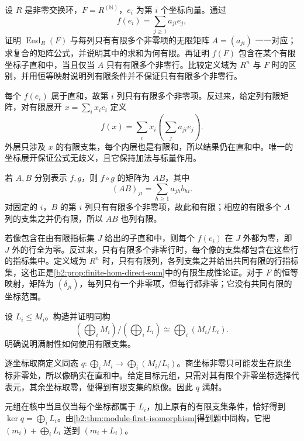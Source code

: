 \begin{exercise}\label{b2:ex:02-finite-hom-direct-sum}
	设 \(R\) 是非零交换环，\(F=R^{(\mathbb N)}\)，\(e_i\) 为第 \(i\) 个坐标向量。通过
	\[
		f(e_i)=\sum_{j\ge1}a_{ji}e_j,
	\]
	证明 \(\operatorname{End}_R(F)\) 与每列只有有限多个非零项的无限矩阵 \(A=(a_{ji})\) 一一对应；求复合的矩阵公式，并说明其中的求和为何有限。再证明 \(f(F)\) 包含在某个有限坐标子直和中，当且仅当 \(A\) 只有有限多个非零行。比较定义域为 \(R^n\) 与 \(F\) 时的区别，并用恒等映射说明列有限条件并不保证只有有限多个非零行。
\end{exercise}
\begin{solution}
	每个 \(f(e_i)\) 属于直和，故第 \(i\) 列只有有限多个非零项。反过来，给定列有限矩阵，对有限展开 \(x=\sum_i x_ie_i\) 定义
	\[
		f(x)=\sum_i x_i\left(\sum_j a_{ji}e_j\right).
	\]
	外层只涉及 \(x\) 的有限支集，每个内层也是有限和，所以结果仍在直和中。唯一的坐标展开保证公式无歧义，且它保持加法与标量作用。

	若 \(A,B\) 分别表示 \(f,g\)，则 \(f\circ g\) 的矩阵为 \(AB\)，其中
	\[
		(AB)_{ji}=\sum_{h\ge1}a_{jh}b_{hi}.
	\]
	对固定的 \(i\)，\(B\) 的第 \(i\) 列只有有限多个非零项，故此和有限；相应的有限多个 \(A\) 列的支集之并仍有限，所以 \(AB\) 也列有限。

	若像包含在由有限指标集 \(J\) 给出的子直和中，则每个 \(f(e_i)\) 在 \(J\) 外都为零，即 \(J\) 外的行全为零。反过来，只有有限多个非零行时，每个像的支集都包含在这些行的指标集中。定义域为 \(R^n\) 时，只有有限列，各列支集之并给出共同有限的行指标集，这也正是\cref{b2:prop:finite-hom-direct-sum}中的有限生成性论证。对于 \(F\) 的恒等映射，矩阵为 \((\delta_{ji})\)，每列只有一个非零项，但每行都非零；它没有共同有限的坐标范围。
\end{solution}

\begin{exercise}\label{b2:ex:02-sum-quotients}
	设 \(L_i\le M_i\)。构造并证明同构
	\[
		\left(\bigoplus_iM_i\right)\Big/\left(\bigoplus_iL_i\right) \cong\bigoplus_i(M_i/L_i).
	\]
	明确说明满射性如何使用有限支集。
\end{exercise}
\begin{solution}
	逐坐标取商定义同态 \(q:\bigoplus_iM_i\to\bigoplus_i(M_i/L_i)\)。商坐标非零只可能发生在原坐标非零处，所以像确实在直和中。给定目标元组，只需对其有限个非零坐标选择代表元，其余坐标取零，便得到有限支集的原像。因此 \(q\) 满射。

	元组在核中当且仅当每个坐标都属于 \(L_i\)，加上原有的有限支集条件，恰好得到 \(\ker q=\bigoplus_iL_i\)。由\cref{b2:thm:module-first-isomorphism}得到题中同构，它把 \((m_i)+\bigoplus_iL_i\) 送到 \((m_i+L_i)\)。
\end{solution}

